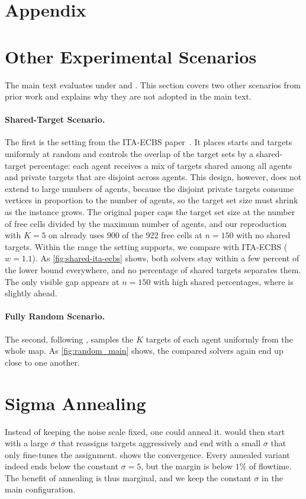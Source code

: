 \appendix
\section*{Appendix}
\suppressfloats[t]

\section{Other Experimental Scenarios}
The main text evaluates \planner under \scenHotspot and \scenEqdist.
This section covers two other scenarios from prior work and explains why they are not adopted in the main text.



\paragraph{Shared-Target Scenario.}
The first is the setting from the ITA-ECBS paper~\cite{tang2024ita-ecbs}.
It places starts and targets uniformly at random and controls the overlap of the target sets by a shared-target percentage: each agent receives a mix of targets shared among all agents and private targets that are disjoint across agents.
This design, however, does not extend to large numbers of agents, because the disjoint private targets consume vertices in proportion to the number of agents, so the target set size must shrink as the instance grows.
The original paper caps the target set size at the number of free cells divided by the maximum number of agents, and our reproduction with $K=5$ on  already uses 900 of the 922 free cells at $n=150$ with no shared targets.
Within the range the setting supports, we compare \planner with ITA-ECBS ($w = 1.1$).
As \cref{fig:shared-ita-ecbs} shows, both solvers stay within a few percent of the lower bound everywhere, and no percentage of shared targets separates them.
The only visible gap appears at $n=150$ with high shared percentages, where \planner is slightly ahead.

\paragraph{Fully Random Scenario.}
The second, following \cite{kumagai2026alternating}, samples the $K$ targets of each agent uniformly from the whole map.
As \cref{fig:random_main} shows, the compared solvers again end up close to one another. 

\section{Sigma Annealing}

Instead of keeping the noise scale fixed, one could anneal it.
\planner would then start with a large $\sigma$ that reassigns targets aggressively and end with a small $\sigma$ that only fine-tunes the assignment.
 shows the convergence.
Every annealed variant indeed ends below the constant $\sigma = 5$, but the margin is below $1\%$ of flowtime.
The benefit of annealing is thus marginal, and we keep the constant $\sigma$ in the main configuration.

